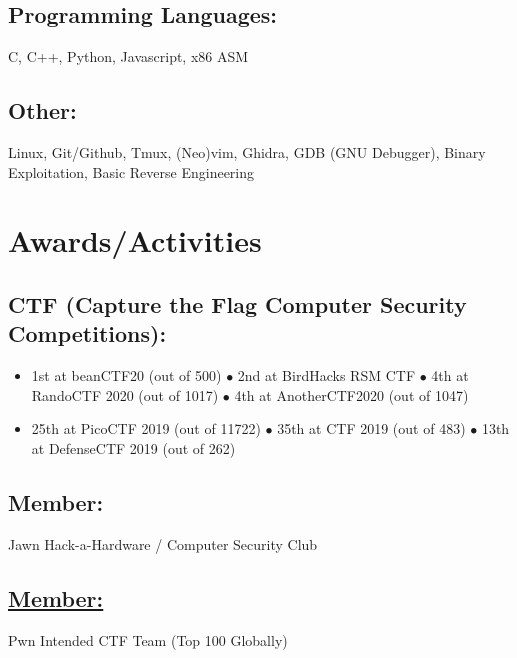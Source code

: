\documentclass{article}
\begin{document}
\subsection{Programming Languages:}
C, C++, Python, Javascript, x86 ASM
\subsection{Other:}
Linux, Git/Github, Tmux, (Neo)vim, Ghidra, GDB (GNU Debugger), Binary Exploitation, Basic Reverse Engineering

\section{Awards/Activities}
\subsection{CTF (Capture the Flag Computer Security Competitions):}
\begin{itemize}
    \item 1st at beanCTF20 (out of 500) $\bullet$ 2nd at BirdHacks RSM CTF $\bullet$ 4th at RandoCTF 2020 (out of 1017) $\bullet$ 4th at AnotherCTF2020 (out of 1047)
    \item 25th at PicoCTF 2019 (out of 11722) $\bullet$ 35th at CTF 2019 (out of 483) $\bullet$ 13th at DefenseCTF 2019 (out of 262)
\end{itemize} 
\subsection{Member: } Jawn Hack-a-Hardware / Computer Security Club 
\subsection{\href{https://youtu.be/DLzxrzFCyOs}{Member: }} Pwn Intended CTF Team (Top 100 Globally)
\end{document}
